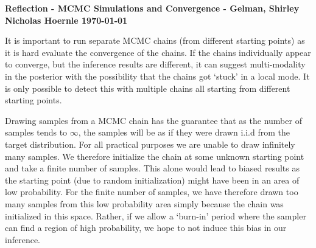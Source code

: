 \documentclass[twoside]{article}
\begin{document}
\textbf{Reflection - MCMC Simulations and Convergence - Gelman, Shirley}\\
\textbf{Nicholas Hoernle \hfill \today}

It is important to run separate MCMC chains (from different starting points) as it is hard evaluate the convergence of the chains. If the chains individually appear to converge, but the inference results are different, it can suggest multi-modality in the posterior with the possibility that the chains got `stuck' in a local mode. It is only possible to detect this with multiple chains all starting from different starting points.

Drawing samples from a MCMC chain has the guarantee that as the number of samples tends to $\infty$, the samples will be as if they were drawn i.i.d from the target distribution. For all practical purposes we are unable to draw infinitely many samples. We therefore initialize the chain at some unknown starting point and take a finite number of samples. This alone would lead to biased results as the starting point (due to random initialization) might have been in an area of low probability. For the finite number of samples, we have therefore drawn too many samples from this low probability area simply because the chain was initialized in this space. Rather, if we allow a `burn-in' period where the sampler can find a region of high probability, we hope to not induce this bias in our inference.
\end{document}
